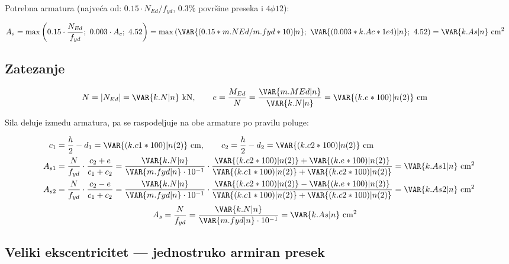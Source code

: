 Potrebna armatura (najveća od: $0.15 \cdot N_{Ed}/f_{yd}$, $0.3\%$ površine preseka i $4\phi 12$):

\begin{align*}
A_s &= \max\left(0.15 \cdot \frac{N_{Ed}}{f_{yd}};\ 0.003 \cdot A_c;\ 4.52\right) = \max\left(\VAR{(0.15*m.NEd/m.fyd*10)|n};\ \VAR{(0.003*k.Ac*1e4)|n};\ 4.52\right) = \VAR{k.As|n} \ \mathrm{cm^2}
\end{align*}

\subsection{Zatezanje}

\begin{align*}
N &= |N_{Ed}| = \VAR{k.N|n} \ \mathrm{kN}, \qquad e = \frac{M_{Ed}}{N} = \frac{\VAR{m.MEd|n}}{\VAR{k.N|n}} = \VAR{(k.e*100)|n(2)} \ \mathrm{cm}
\end{align*}

Sila deluje između armatura, pa se raspodeljuje na obe armature po pravilu poluge:

\begin{align*}
c_1 &= \frac{h}{2} - d_1 = \VAR{(k.c1*100)|n(2)} \ \mathrm{cm}, \qquad c_2 = \frac{h}{2} - d_2 = \VAR{(k.c2*100)|n(2)} \ \mathrm{cm} \\
A_{s1} &= \frac{N}{f_{yd}} \cdot \frac{c_2 + e}{c_1 + c_2} = \frac{\VAR{k.N|n}}{\VAR{m.fyd|n} \cdot 10^{-1}} \cdot \frac{\VAR{(k.c2*100)|n(2)} + \VAR{(k.e*100)|n(2)}}{\VAR{(k.c1*100)|n(2)} + \VAR{(k.c2*100)|n(2)}} = \VAR{k.As1|n} \ \mathrm{cm^2} \\
A_{s2} &= \frac{N}{f_{yd}} \cdot \frac{c_2 - e}{c_1 + c_2} = \frac{\VAR{k.N|n}}{\VAR{m.fyd|n} \cdot 10^{-1}} \cdot \frac{\VAR{(k.c2*100)|n(2)} - \VAR{(k.e*100)|n(2)}}{\VAR{(k.c1*100)|n(2)} + \VAR{(k.c2*100)|n(2)}} = \VAR{k.As2|n} \ \mathrm{cm^2}
\end{align*}
\begin{align*}
A_s &= \frac{N}{f_{yd}} = \frac{\VAR{k.N|n}}{\VAR{m.fyd|n} \cdot 10^{-1}} = \VAR{k.As|n} \ \mathrm{cm^2}
\end{align*}

\subsection{Veliki ekscentricitet --- jednostruko armiran presek}

